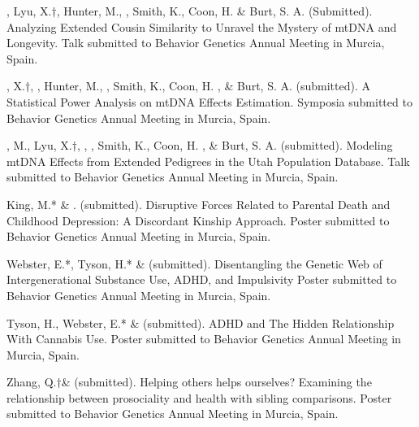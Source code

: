 
\item \meb, Lyu, X.$\dagger$, Hunter, M.,  \Joe, Smith, K., Coon, H. \& Burt, S. A. (Submitted). Analyzing Extended Cousin Similarity to Unravel the Mystery of mtDNA and Longevity. Talk submitted to Behavior Genetics Annual Meeting in Murcia, Spain.

\item \Lyu, X.$\dagger$, \meb, Hunter, M.,  \Joe, Smith, K., Coon, H. , \& Burt, S. A. (submitted). A Statistical Power Analysis on mtDNA Effects Estimation. Symposia submitted to Behavior Genetics Annual Meeting in Murcia, Spain.

\item \Hunter, M., Lyu, X.$\dagger$, \meb,  \Joe, Smith, K., Coon, H. , \& Burt, S. A. (submitted). Modeling mtDNA Effects from Extended Pedigrees in the Utah Population Database. Talk submitted to Behavior Genetics Annual Meeting in Murcia, Spain.

\item  King, M.* \& \meb. (submitted).  Disruptive Forces Related to Parental Death and Childhood Depression: A Discordant Kinship Approach. Poster submitted to Behavior Genetics Annual Meeting in Murcia, Spain.

\item Webster, E.*, Tyson, H.* \& \meb (submitted). Disentangling the Genetic Web of Intergenerational Substance Use, ADHD, and Impulsivity Poster submitted to Behavior Genetics Annual Meeting in Murcia, Spain.


\item Tyson, H., Webster, E.*  \& \meb (submitted). ADHD and The Hidden Relationship With Cannabis Use. Poster submitted to Behavior Genetics Annual Meeting in Murcia, Spain.

\item Zhang, Q.$\dagger$\& \meb (submitted). Helping others helps ourselves? Examining the relationship between prosociality and health with sibling comparisons. Poster submitted to Behavior Genetics Annual Meeting in Murcia, Spain.




%
%

%

%

%

%
